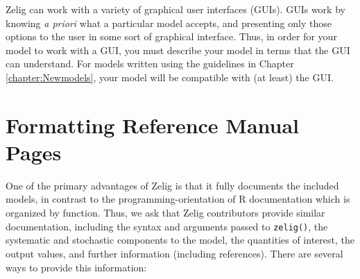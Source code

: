 Zelig can work with a variety of graphical user interfaces (GUIs).  GUIs
work by knowing {\it a priori} what a particular model
accepts, and presenting only those options to the user in some sort of
graphical interface.  Thus, in order for your model to work with a
GUI, you must describe your model in terms that the GUI can
understand.  For models written using the guidelines in Chapter
\ref{chapter:Newmodels}, your model will be compatible with (at least)
the  GUI.

\section{Formatting Reference Manual Pages}  \label{s:format}

One of the primary advantages of Zelig is that it fully documents the
included models, in contrast to the programming-orientation of R
documentation which is organized by function.  Thus, we ask that Zelig
contributors provide similar documentation, including the syntax and
arguments passed to {\tt zelig()}, the systematic and stochastic
components to the model, the quantities of interest, the output
values, and further information (including references).  There are
several ways to provide this information:  
